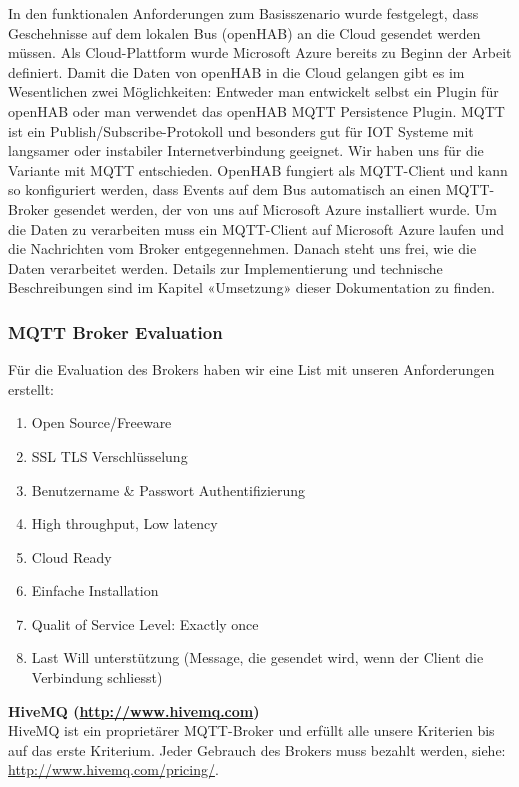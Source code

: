 In den funktionalen Anforderungen zum Basisszenario wurde festgelegt, dass Geschehnisse auf dem lokalen Bus (openHAB) an die Cloud gesendet werden müssen. Als Cloud-Plattform wurde Microsoft Azure bereits zu Beginn der Arbeit definiert. Damit die Daten von openHAB in die Cloud gelangen gibt es im Wesentlichen zwei Möglichkeiten: Entweder man entwickelt selbst ein Plugin für openHAB oder man verwendet das openHAB MQTT Persistence Plugin. MQTT ist ein Publish/Subscribe-Protokoll und besonders gut für IOT Systeme mit langsamer oder instabiler Internetverbindung geeignet. Wir haben uns für die Variante mit MQTT entschieden. OpenHAB fungiert als MQTT-Client und kann so konfiguriert werden, dass Events auf dem Bus automatisch an einen MQTT-Broker gesendet werden, der von uns auf Microsoft Azure installiert wurde. Um die Daten zu verarbeiten muss ein MQTT-Client auf Microsoft Azure laufen und die Nachrichten vom Broker entgegennehmen. Danach steht uns frei, wie die Daten verarbeitet werden. Details zur Implementierung und technische Beschreibungen sind im Kapitel «Umsetzung» dieser Dokumentation zu finden. 

\subsubsection{MQTT Broker Evaluation}
Für die Evaluation des Brokers haben wir eine List mit unseren Anforderungen erstellt: 

\begin{enumerate}
	\item Open Source/Freeware
	\item SSL TLS Verschlüsselung
	\item Benutzername \& Passwort Authentifizierung
	\item High throughput, Low latency
	\item Cloud Ready
	\item Einfache Installation
	\item Qualit of Service Level: Exactly once
	\item Last Will unterstützung (Message, die gesendet wird, wenn der Client die Verbindung schliesst)
\end{enumerate}

\textbf{HiveMQ (\url{http://www.hivemq.com})} \\
HiveMQ ist ein proprietärer MQTT-Broker und erfüllt alle unsere Kriterien bis auf das erste Kriterium. Jeder Gebrauch des Brokers muss bezahlt werden, siehe: \url{http://www.hivemq.com/pricing/}.

